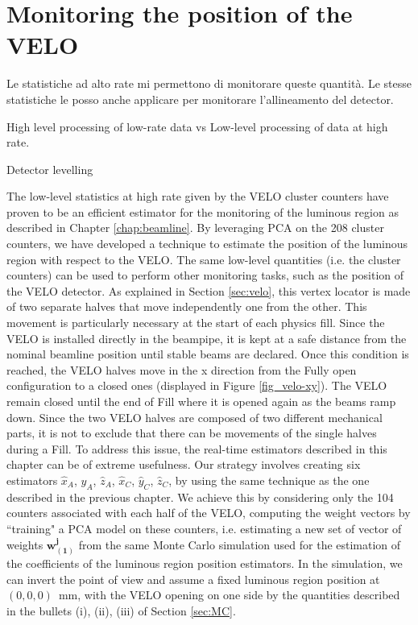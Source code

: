 \chapter{Monitoring the position of the VELO}
\label{chp:pos_VELO}
Le statistiche ad alto rate mi permettono di monitorare queste quantità. 
Le stesse statistiche le posso anche applicare per monitorare l'allineamento del detector. 

High level processing of low-rate data vs Low-level processing of data at high rate.

Detector levelling 

The low-level statistics at high rate given by the VELO cluster counters have proven to be an efficient estimator for the monitoring of the luminous region as described in Chapter \ref{chap:beamline}. By leveraging PCA on the 208 cluster counters, we have developed a technique to estimate the position of the luminous region with respect to the VELO. The same low-level quantities (i.e. the cluster counters) can be used to perform other monitoring tasks, such as the position of the VELO detector. As explained in Section \ref{sec:velo}, this vertex locator is made of two separate halves that move independently one from the other. This movement is particularly necessary at the start of each physics fill. Since the VELO is installed directly in the beampipe, it is kept at a safe distance from the nominal beamline position until stable beams are declared. Once this condition is reached, the VELO halves move in the x direction from the Fully open configuration to a closed ones (displayed in Figure \ref{fig_velo-xy}). The VELO remain closed until the end of Fill where it is opened again as the beams ramp down. Since the two VELO halves are composed of two different mechanical parts, it is not to exclude that there can be movements of the single halves during a Fill. To address this issue, the real-time estimators described in this chapter can be of extreme usefulness. 
Our strategy involves creating six estimators $\hat{x}_A$, $\hat{y}_A$, $\hat{z}_A$, $\hat{x}_C$, $\hat{y}_C$, $\hat{z}_C$, by using the same technique as the one described in the previous chapter. We achieve this by considering only the 104 counters associated with each half of the VELO, computing the weight vectors by ``training" a PCA model on these counters, i.e. estimating a new set of vector of weights $\mathbf{w^j_(1)}$ from the same Monte Carlo simulation used for the estimation of the coefficients of the luminous region position estimators.
In the simulation, we can invert the point of view and assume a fixed luminous region position at $(0,0,0)$~mm, with the VELO opening on one side by the quantities described in the bullets (i), (ii), (iii) of Section \ref{sec:MC}. 



